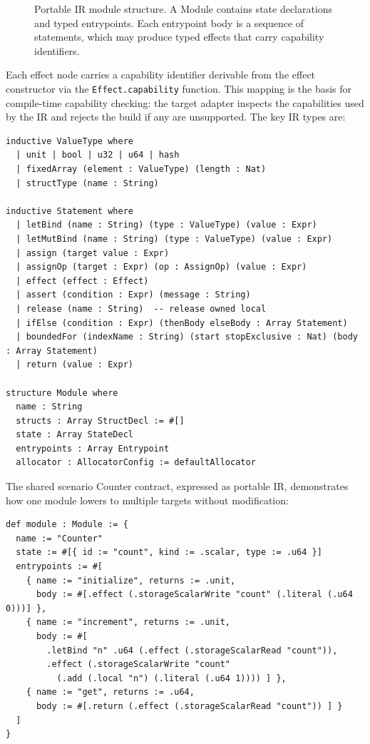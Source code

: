 \documentclass[sigconf]{acmart}
\begin{document}
\begin{figure}[t]
  \caption{Portable IR module structure. A Module contains state declarations
  and typed entrypoints. Each entrypoint body is a sequence of statements, which
  may produce typed effects that carry capability identifiers.}
  \label{fig:ir-overview}
\end{figure}

Each effect node carries a capability identifier derivable from the effect constructor via the
\texttt{Effect.capability} function. This mapping is the basis for compile-time capability
checking: the target adapter inspects the capabilities used by the IR and rejects the build if
any are unsupported. The key IR types are:

\begin{lstlisting}
inductive ValueType where
  | unit | bool | u32 | u64 | hash
  | fixedArray (element : ValueType) (length : Nat)
  | structType (name : String)

inductive Statement where
  | letBind (name : String) (type : ValueType) (value : Expr)
  | letMutBind (name : String) (type : ValueType) (value : Expr)
  | assign (target value : Expr)
  | assignOp (target : Expr) (op : AssignOp) (value : Expr)
  | effect (effect : Effect)
  | assert (condition : Expr) (message : String)
  | release (name : String)  -- release owned local
  | ifElse (condition : Expr) (thenBody elseBody : Array Statement)
  | boundedFor (indexName : String) (start stopExclusive : Nat) (body : Array Statement)
  | return (value : Expr)

structure Module where
  name : String
  structs : Array StructDecl := #[]
  state : Array StateDecl
  entrypoints : Array Entrypoint
  allocator : AllocatorConfig := defaultAllocator
\end{lstlisting}

The shared scenario Counter contract, expressed as portable IR, demonstrates how one module
lowers to multiple targets without modification:

\begin{lstlisting}
def module : Module := {
  name := "Counter"
  state := #[{ id := "count", kind := .scalar, type := .u64 }]
  entrypoints := #[
    { name := "initialize", returns := .unit,
      body := #[.effect (.storageScalarWrite "count" (.literal (.u64 0)))] },
    { name := "increment", returns := .unit,
      body := #[
        .letBind "n" .u64 (.effect (.storageScalarRead "count")),
        .effect (.storageScalarWrite "count"
          (.add (.local "n") (.literal (.u64 1)))) ] },
    { name := "get", returns := .u64,
      body := #[.return (.effect (.storageScalarRead "count")) ] }
  ]
}
\end{lstlisting}
\end{document}
